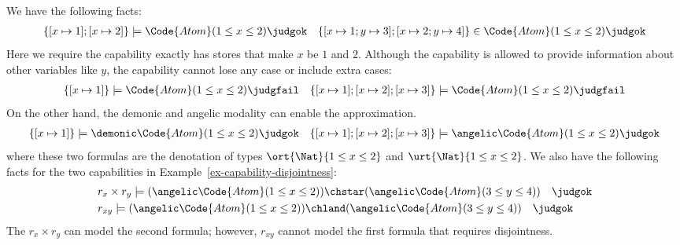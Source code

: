 \begin{definition}
\begin{example}
  We have the following facts:
  \begin{align*}
    &\{ [x\mapsto 1]; [x\mapsto 2] \} \models \Code{Atom}(1 \leq x \leq 2)\judgok
    &\{ [x\mapsto 1; y \mapsto 3]; [x\mapsto 2; y \mapsto 4] \} \in \Code{Atom}(1 \leq x \leq 2)\judgok
  \end{align*}\noindent
  Here we require the capability exactly has stores that make $x$ be $1$ and $2$. Although the capability is allowed to provide information about other variables like $y$, the capability cannot lose any case or include extra cases:
  \begin{align*}
    &\{ [x\mapsto 1] \} \models \Code{Atom}(1 \leq x \leq 2)\judgfail
   &\{ [x\mapsto 1]; [x\mapsto 2]; [x\mapsto 3] \} \models \Code{Atom}(1 \leq x \leq 2)\judgfail
  \end{align*}\noindent
  On the other hand, the demonic and angelic modality can enable the approximation.
  \begin{align*}
    &\{ [x\mapsto 1] \} \models \demonic \Code{Atom}(1 \leq x \leq 2)\judgok
   &\{ [x\mapsto 1]; [x\mapsto 2]; [x\mapsto 3] \} \models \angelic \Code{Atom}(1 \leq x \leq 2)\judgok
  \end{align*}\noindent
  where these two formulas are the denotation of types $\ort{\Nat}{1 \leq x \leq 2}$ and $\urt{\Nat}{1 \leq x \leq 2}$.
  We also have the following facts for the two capabilities in Example~\ref{ex-capability-disjointness}: 
  \begin{align*}
    &r_x \times r_y \models (\angelic \Code{Atom}(1 \leq x \leq 2)) \chstar (\angelic \Code{Atom}(3 \leq y \leq 4))  \quad \judgok
   \\&r_{xy} \models (\angelic \Code{Atom}(1 \leq x \leq 2)) \chland (\angelic \Code{Atom}(3 \leq y \leq 4))  \quad \judgok
  \end{align*}\noindent 
  The $r_x \times r_y$ can model the second formula; however, $r_{xy}$ cannot model the first formula that requires disjointness.
\end{example}



\end{definition}
